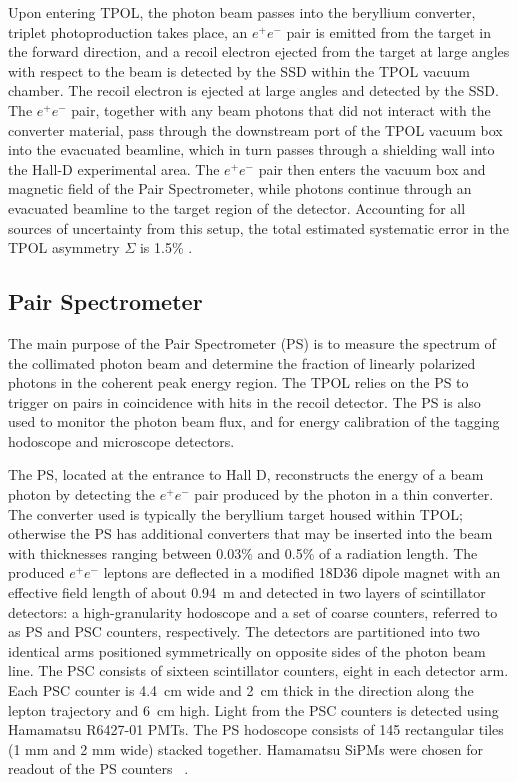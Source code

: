 Upon entering TPOL, the photon beam passes into the
beryllium converter, triplet photoproduction takes place, an
$e^+e^-$ pair is emitted from the target in the forward direction,
and a recoil electron ejected from the target at large angles with
respect to the beam is detected by the SSD within the TPOL vacuum chamber.
The recoil electron is ejected at large angles and detected by the SSD.
The $e^+e^-$ pair, together with any beam photons that did not
interact with the converter material, pass through the downstream port of
the TPOL vacuum box into the evacuated beamline, which in turn passes
through a shielding wall into the Hall-D experimental area. 
The $e^+e^-$ pair then enters the vacuum box and magnetic field of the \GX{}
Pair Spectrometer, while photons continue through an evacuated beamline to
the target region of the \gx{} detector. Accounting for all sources of
uncertainty from this setup, the total estimated systematic error in
the TPOL asymmetry $\Sigma$ is 1.5\% \cite{DUGGER2017115}.

\subsection{Pair Spectrometer  \label{sec:ps}}
The main purpose of the Pair Spectrometer (PS) \cite{BARBOSA2015376} 
is to measure the spectrum of the
collimated photon beam and determine the fraction of linearly polarized
photons in the coherent peak energy region. The TPOL relies on the PS
to trigger on pairs in coincidence with hits in the recoil detector.
The PS is also used to monitor the photon beam flux, and for 
energy calibration of the tagging hodoscope and microscope detectors.

The PS, located at the entrance to Hall D, %
reconstructs the energy of a beam photon by detecting
the $e^+e^-$ pair produced by the photon in a thin converter.
The converter used is typically the beryllium target housed within TPOL; 
otherwise the PS has additional converters that may
be inserted into the beam with thicknesses ranging between 0.03\%
and 0.5\% of a radiation length.
The produced $e^+e^-$ leptons are deflected in a modified 18D36 dipole magnet
with an effective field length of about 0.94~m and detected in two
layers of scintillator detectors: a high-granularity hodoscope and
a set of coarse counters, referred to as PS and PSC counters, respectively.
The detectors are partitioned into two identical arms positioned symmetrically on
opposite sides of the photon beam line. The PSC consists of sixteen
scintillator counters, eight in each detector arm. Each PSC counter is
4.4~cm wide and 2~cm thick in the direction along the lepton trajectory
and 6~cm high. Light from the PSC counters is detected using Hamamatsu
R6427-01 PMTs. The PS hodoscope consists of 145 rectangular tiles
(1 mm and 2 mm wide) stacked together. Hamamatsu SiPMs were chosen for
readout of the PS counters
~\cite{Barbosa:2017zzw,Somov:2017kif,Tolstukhin:2014zsa}.

